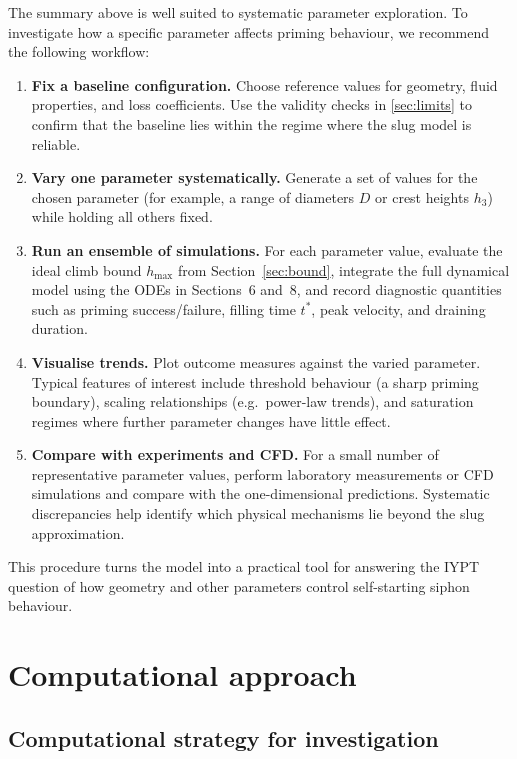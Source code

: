 \documentclass[11pt]{article}
\begin{document}
The summary above is well suited to systematic parameter exploration. To investigate how a
specific parameter affects priming behaviour, we recommend the following workflow:
\begin{enumerate}
  \item \textbf{Fix a baseline configuration.} Choose reference values for geometry, fluid
        properties, and loss coefficients. Use the validity checks in \cref{sec:limits} to
        confirm that the baseline lies within the regime where the slug model is reliable.
  \item \textbf{Vary one parameter systematically.} Generate a set of values for the chosen
        parameter (for example, a range of diameters $D$ or crest heights $h_3$) while holding
        all others fixed.
  \item \textbf{Run an ensemble of simulations.} For each parameter value, evaluate the ideal
        climb bound $h_{\max}$ from Section~\ref{sec:bound}, integrate the full dynamical model
        using the ODEs in Sections~6 and~8, and record diagnostic quantities such as priming
        success/failure, filling time $t^*$, peak velocity, and draining duration.
  \item \textbf{Visualise trends.} Plot outcome measures against the varied parameter. Typical
        features of interest include threshold behaviour (a sharp priming boundary), scaling
        relationships (e.g.\ power-law trends), and saturation regimes where further parameter
        changes have little effect.
  \item \textbf{Compare with experiments and CFD.} For a small number of representative
        parameter values, perform laboratory measurements or CFD simulations and compare with
        the one-dimensional predictions. Systematic discrepancies help identify which physical
        mechanisms lie beyond the slug approximation.
\end{enumerate}
This procedure turns the model into a practical tool for answering the IYPT question of how
geometry and other parameters control self-starting siphon behaviour.

\section{Computational approach}
\label{sec:comp}

\subsection{Computational strategy for investigation}
\end{document}
